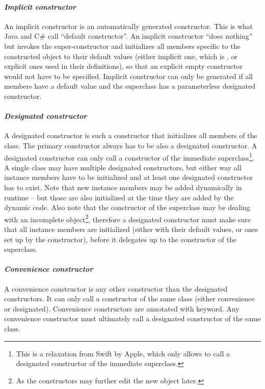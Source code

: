 \paragraph{\em Implicit constructor}
An implicit constructor is an automatically generated constructor. This is what Java and C\# call ``default constructor''. An implicit constructor ``does nothing'' but invokes the super-constructor and initializes all members specific to the constructed object to their default values (either implicit one, which is , or explicit ones used in their definitions), so that an explicit empty constructor would not have to be specified. Implicit constructor can only be generated if all members have a default value and the superclass has a parameterless designated constructor. 

\paragraph{\em Designated constructor}
A designated constructor is such a constructor that initializes all members of the class. The primary constructor always has to be also a designated constructor. A designated constructor can only call a constructor of the immediate superclass\footnote{This is a relaxation from Swift by Apple, which only allows to call a designated constructor of the immediate superclass.}. A single class may have multiple designated constructors, but either way all instance members have to be initialized and at least one designated constructor has to exist. Note that new instance members may be added dynamically in runtime -- but those are also initialized at the time they are added by the dynamic code. Also note that the constructor of the superclass may be dealing with an incomplete object\footnote{As the constructors may further edit the new object later.}, therefore a designated constructor must make sure that all instance members are initialized (either with their default values, or ones set up by the constructor), before it delegates up to the constructor of the superclass. 

\paragraph{\em Convenience constructor}
A convenience constructor is any other constructor than the designated constructors. It can only call a constructor of the same class (either convenience or designated). Convenience constructors are annotated with  keyword. Any convenience constructor must ultimately call a designated constructor of the same class. 


